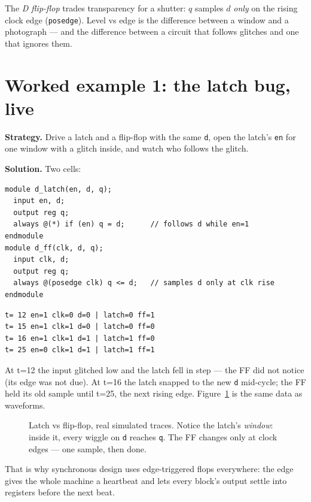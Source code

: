 The \emph{D flip-flop} trades transparency for a
shutter: $q$ samples $d$ \emph{only} on the rising clock edge
(\texttt{posedge}). Level vs edge is the difference between a window
and a photograph — and the difference between a circuit that follows
glitches and one that ignores them.

\section{Worked example 1: the latch bug, live}
\label{sec:we-latch}

\textbf{Strategy.} Drive a latch and a flip-flop with the same
\texttt{d}, open the latch's \texttt{en} for one window with a glitch
inside, and watch who follows the glitch.

\textbf{Solution.} Two cells:
\begin{lstlisting}[caption={\ttfamily code/ch10\_dff.v --- latch vs
flip-flop, same inputs.},label={lst:dff},abovecaptionskip=0pt]
module d_latch(en, d, q);
  input en, d;
  output reg q;
  always @(*) if (en) q = d;      // follows d while en=1
endmodule
module d_ff(clk, d, q);
  input clk, d;
  output reg q;
  always @(posedge clk) q <= d;   // samples d only at clk rise
endmodule
\end{lstlisting}

\begin{lstlisting}[caption={Excerpt of the real \texttt{vvp} run ---
the latch tracks the mid-window glitch; the FF waits for an edge.},
abovecaptionskip=0pt]
t= 12 en=1 clk=0 d=0 | latch=0 ff=1
t= 15 en=1 clk=1 d=0 | latch=0 ff=0
t= 16 en=1 clk=1 d=1 | latch=1 ff=0
t= 25 en=0 clk=1 d=1 | latch=1 ff=1
\end{lstlisting}

At t=12 the input glitched low and the latch fell in step — the FF did
not notice (its edge was not due). At t=16 the latch snapped to the new
\texttt{d} mid-cycle; the FF held its old sample until t=25, the next
rising edge. Figure~\ref{fig:timing} is the same data as waveforms.

\begin{figure}[htbp]
\centering

\caption{Latch vs flip-flop, real simulated traces. Notice the latch's
\emph{window}: inside it, every wiggle on \texttt{d} reaches \texttt{q}.
The FF changes only at clock edges — one sample, then done.}
\label{fig:timing}
\end{figure}

That is why synchronous design uses edge-triggered flops everywhere:
the edge gives the whole machine a heartbeat and lets every block's
output settle into registers before the next beat.

